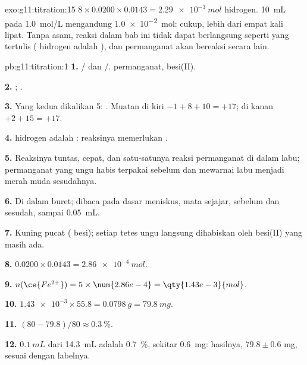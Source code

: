 \begin{solution}{exo:g11:titration:15}
$8 \times 0.0200 \times 0.0143 = \qty{2.29e-3}{mol}$  hidrogen.
\qty{10}{mL} pada \qty{1.0}{mol/L} mengandung \qty{1.0e-2}{mol}: cukup,
lebih dari empat kali lipat. Tanpa asam, reaksi dalam bab ini tidak dapat
berlangsung seperti yang tertulis ( hidrogen adalah ), dan
permanganat akan bereaksi secara lain.
\end{solution}

\begin{solution}{pb:g11:titration:1}
\textbf{1.} / dan /.
  permanganat,   besi(II).

\textbf{2.} ;
.

\textbf{3.} Yang kedua dikalikan 5:
. Muatan di
kiri $-1 + 8 + 10 = +17$; di kanan $+2 + 15 = +17$.

\textbf{4.}  hidrogen adalah : reaksinya memerlukan .

\textbf{5.} Reaksinya tuntas, cepat, dan satu-satunya reaksi permanganat
di dalam labu; permanganat yang ungu habis terpakai sebelum  dan mewarnai labu menjadi merah muda sesudahnya.

\textbf{6.} Di dalam buret; dibaca pada dasar meniskus, mata sejajar,
sebelum dan sesudah, sampai \qty{0.05}{mL}.

\textbf{7.} Kuning pucat ( besi); setiap tetes ungu langsung
dihabiskan oleh  besi(II) yang masih ada.

\textbf{8.} $0.0200 \times 0.0143 = \qty{2.86e-4}{mol}$.

\textbf{9.} $n(\ce{Fe^{2+}}) = 5 \times \num{2.86e-4} =
\qty{1.43e-3}{mol}$.

\textbf{10.} $\num{1.43e-3} \times 55.8 = \qty{0.0798}{g} =
\qty{79.8}{mg}$.

\textbf{11.} $(80 - 79.8)/80 \approx \qty{0.3}{\percent}$.

\textbf{12.} $\qty{0.1}{mL}$ dari \qty{14.3}{mL} adalah
\qty{0.7}{\percent}, sekitar \qty{0.6}{mg}: hasilnya, $79.8 \pm 0.6$ mg,
sesuai dengan labelnya.


\end{solution}
